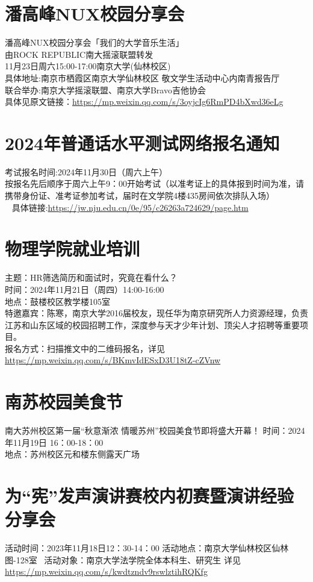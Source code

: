 \documentclass[letterpaper, 12pt]{article}
\begin{document}
\begin{multicols}{2}
\section{潘高峰NUX校园分享会}
潘高峰NUX校园分享会「我们的大学音乐生活」\\
由ROCK REPUBLIC南大摇滚联盟转发\\
11月23日周六15:00-17:00南京大学(仙林校区)\\
具体地址:南京市栖霞区南京大学仙林校区 敬文学生活动中心内南青报告厅\\
联合举办:南京大学摇滚联盟、南京大学Bravo吉他协会\\
具体见原文链接：\url{https://mp.weixin.qq.com/s/3oyjcIg6RmPD4bXwd36eLg}

\section{2024年普通话水平测试网络报名通知}
考试报名时间:2024年11月30日（周六上午）\\
按报名先后顺序于周六上午9：00开始考试（以准考证上的具体报到时间为准，请携带身份证、准考证参加考试，届时在文学院4楼435房间依次排队入场）\\ 
具体链接:\url{https://jw.nju.edu.cn/0e/95/c26263a724629/page.htm}


\section{物理学院就业培训}
主题：HR筛选简历和面试时，究竟在看什么？\\
时间：2024年11月21日（周四）14:00-16:00\\
地点：鼓楼校区教学楼105室\\
特邀嘉宾：陈寒，南京大学2016届校友，现任华为南京研究所人力资源经理，负责江苏和山东区域的校园招聘工作，深度参与天才少年计划、顶尖人才招聘等重要项目。\\
报名方式：扫描推文中的二维码报名，详见\url{https://mp.weixin.qq.com/s/BKmvIdESxD3U18tZ-cZVnw}

\section{南苏校园美食节}
南大苏州校区第一届“秋意渐浓 情暖苏州”校园美食节即将盛大开幕！
时间：2024年11月19日 16：00-18：00\\
地点：苏州校区元和楼东侧露天广场\\


\section{为“宪”发声演讲赛校内初赛暨演讲经验分享会}
活动时间：2023年11月18日12：30-14：00
活动地点：南京大学仙林校区仙林图-128室 
活动对象：南京大学法学院全体本科生、研究生
详见\url{https://mp.weixin.qq.com/s/kwdtzndv9rswlztihRQKfg}


\end{multicols}
\end{document}
